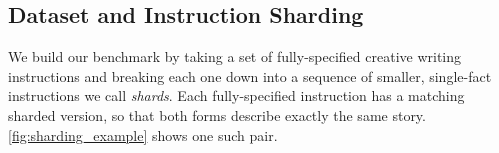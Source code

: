 \subsection{Dataset and Instruction Sharding}
\label{sec:sharding}

We build our benchmark by taking a set of fully-specified creative writing instructions and breaking each one down into a sequence of smaller, single-fact instructions we call \textit{shards}. Each fully-specified instruction has a matching sharded version, so that both forms describe exactly the same story. \cref{fig:sharding_example} shows one such pair.

\begin{figure}[t]
\centering


\newcommand{\shard}[2]{{\sethlcolor{#1}\hl{#2}}}


\end{figure}
